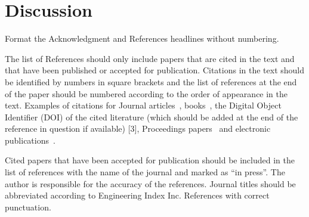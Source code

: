 \section*{Discussion}

Format the Acknowledgment and References headlines without numbering.

\bigskip
The list of References should only include papers that are cited in the
text and that have been published or accepted for publication. Citations
in the text should be identified by numbers in square brackets and the
list of references at the end of the paper should be numbered according
to the order of appearance in the text. Examples of citations for
Journal articles~\cite{smith99}, books~\cite{south01}, the Digital
Object Identifier (DOI) of the cited literature (which should be added
at the end of the reference in question if available) [3], Proceedings
papers~\cite{lock03} and electronic publications~\cite{IFMBE}.

Cited papers that have been accepted for publication should be included
in the list of references with the name of the journal and marked as
``in press''. The author is responsible for the accuracy of the
references. Journal titles should be abbreviated according to
Engineering Index Inc. References with correct punctuation.